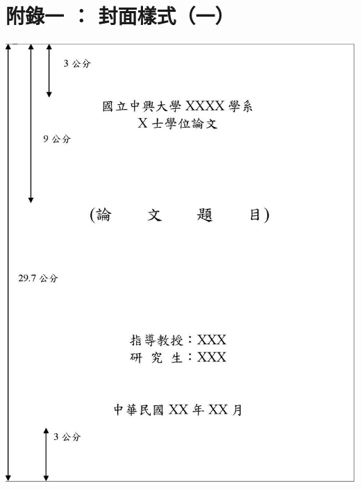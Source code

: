 \documentclass[12pt,oneside,openany,a4paper]{book}
\begin{document}
\chapter{附錄一 ： 封面樣式（一）}
    \begin{center}
        \includegraphics[bb=0 0 1155 1460,width=\textwidth]{TitlePage1.jpg}
    \end{center}
\end{document}
